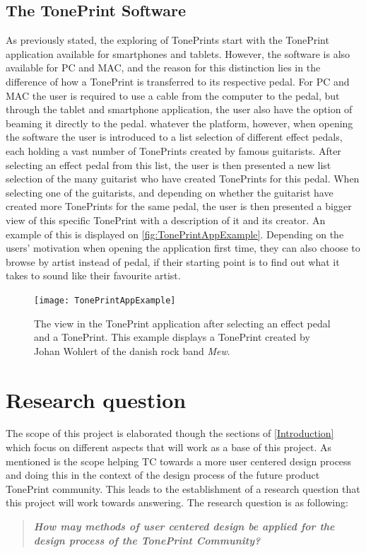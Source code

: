 \subsection{The TonePrint Software}
\label{TonePrintSoftware}
As previously stated, the exploring of TonePrints start with the TonePrint application available for smartphones and tablets. However, the software is also available for PC and MAC, and the reason for this distinction lies in the difference of how a TonePrint is transferred to its respective pedal. For PC and MAC the user is required to use a cable from the computer to the pedal, but through the tablet and smartphone application, the user also have the option of beaming it directly to the pedal. whatever the platform, however, when opening the software the user is introduced to a list selection of different effect pedals, each holding a vast number of TonePrints created by famous guitarists. After selecting an effect pedal from this list, the user is then presented a new list selection of the many guitarist who have created TonePrints for this pedal. When selecting one of the guitarists, and depending on whether the guitarist have created more TonePrints for the same pedal, the user is then presented a bigger view of this specific TonePrint with a description of it and its creator. An example of this is displayed on \autoref{fig:TonePrintAppExample}. Depending on the users' motivation when opening the application first time, they can also choose to browse by artist instead of pedal, if their starting point is to find out what it takes to sound like their favourite artist.
%
\begin{figure}[H]
	\centering
	\texttt{[image: TonePrintAppExample]}
	\caption{The view in the TonePrint application after selecting an effect pedal and a TonePrint. This example displays a TonePrint created by Johan Wohlert of the danish rock band \textit{Mew}.}
	\label{fig:TonePrintAppExample}
\end{figure}

\newpage
%
\section{Research question}
\label{ResearchQuestion}
%
The scope of this project is elaborated though the sections of  \autoref{Introduction} which focus on different aspects that will work as a base of this project. As mentioned is the scope helping TC towards a more user centered design process and doing this in the context of the design process of the future product TonePrint community. This leads to the establishment of a research question that this project will work towards answering. The research question is as following:

\begin{quote}
	\textbf{\textit{How may methods of user centered design be applied for the design process of the TonePrint Community?}}
\end{quote}
